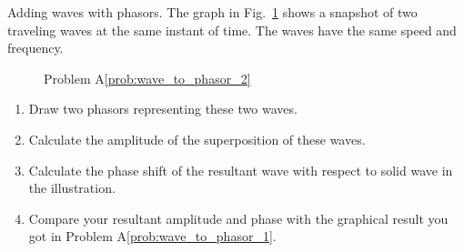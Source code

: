 \begin{aproblem}{Adding waves with phasors.}
  The graph in Fig.~\ref{fig:wave_to_phasor_2} shows a snapshot of two
  traveling waves at the same instant of time.  The waves have the
  same speed and frequency.
  \label{prob:wave_to_phasor_2}
  \begin{figure}[h]
    \begin{center}
      \caption{Problem A\ref{prob:wave_to_phasor_2}}
      \label{fig:wave_to_phasor_2}
    \end{center}
  \end{figure}

  \begin{enumerate}
  \item Draw two phasors representing these two waves.
  \item Calculate the amplitude of the superposition of these waves.  
  \item Calculate the phase shift of the resultant wave
    with respect to solid wave in the illustration.
  \item Compare your resultant amplitude and phase with the 
    graphical result you got in Problem A\ref{prob:wave_to_phasor_1}.	
  \end{enumerate}
\end{aproblem}


